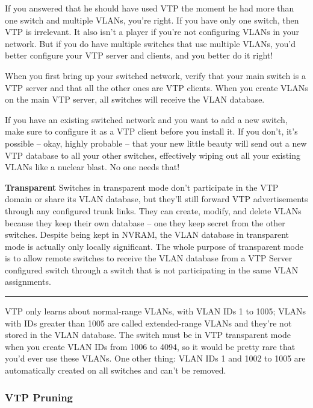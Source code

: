 If you answered that he should have used VTP the moment he had more than
one switch and multiple VLANs, you're right. If you have only one
switch, then VTP is irrelevant. It also isn't a player if you're not
configuring VLANs in your network. But if you do have multiple switches
that use multiple VLANs, you'd better configure your VTP server and
clients, and you better do it right!

When you first bring up your switched network, verify that your main
switch is a VTP server and that all the other ones are VTP clients. When
you create VLANs on the main VTP server, all switches will receive the
VLAN database.

If you have an existing switched network and you want to add a new
switch, make sure to configure it as a VTP client before you install it.
If you don't, it's possible -- okay, highly probable -- that your new
little beauty will send out a new VTP database to all your other
switches, effectively wiping out all your existing VLANs like a nuclear
blast. No one needs that!

\textbf{Transparent}
Switches in transparent mode don't participate in the VTP domain or
share its VLAN database, but they'll still forward VTP advertisements
through any configured trunk links. They can create, modify, and delete
VLANs because they keep their own database -- one they keep secret from
the other switches. Despite being kept in NVRAM, the VLAN database in
transparent mode is actually only locally significant. The whole purpose
of transparent mode is to allow remote switches to receive the VLAN
database from a VTP Server configured switch through a switch that is
not participating in the same VLAN assignments.

\begin{center}\rule{0.5\linewidth}{0.5pt}\end{center}

VTP only learns about normal-range VLANs, with VLAN IDs 1 to 1005; VLANs
with IDs greater than 1005 are called extended-range VLANs and they're
not stored in the VLAN database. The switch must be in VTP transparent
mode when you create VLAN IDs from 1006 to 4094, so it would be pretty
rare that you'd ever use these VLANs. One other thing: VLAN IDs 1 and
1002 to 1005 are automatically created on all switches and can't be
removed.

\subsubsection[VTP
Pruning]{\texorpdfstring{\protect\hypertarget{c15.xhtmlux5cux23c15-sec-6}{}{}VTP
Pruning}{VTP Pruning}}


